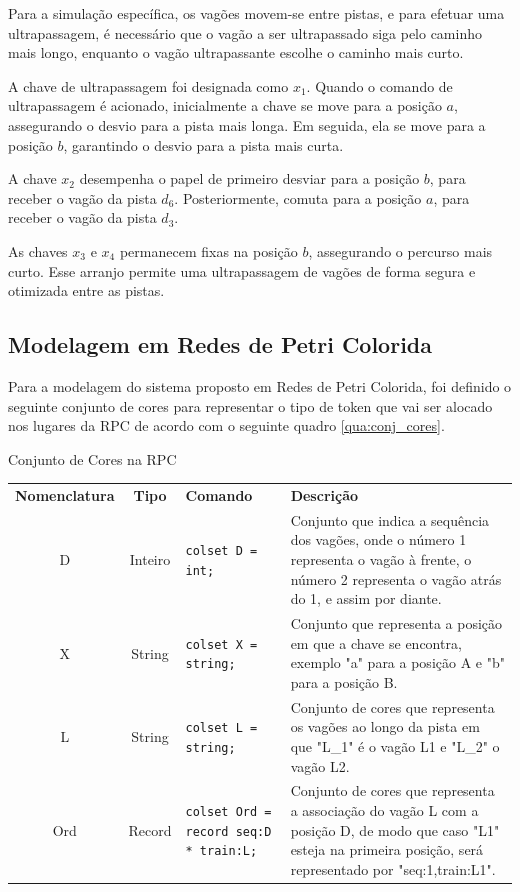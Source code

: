 Para a simulação específica, os vagões movem-se entre pistas, e para efetuar uma ultrapassagem, é necessário que o vagão a ser ultrapassado siga pelo caminho mais longo, enquanto o vagão ultrapassante escolhe o caminho mais curto.

A chave de ultrapassagem foi designada como $x_1$. Quando o comando de ultrapassagem é acionado, inicialmente a chave se move para a posição $a$, assegurando o desvio para a pista mais longa. Em seguida, ela se move para a posição $b$, garantindo o desvio para a pista mais curta.

A chave $x_2$ desempenha o papel de primeiro desviar para a posição $b$, para receber o vagão da pista $d_6$. Posteriormente, comuta para a posição $a$, para receber o vagão da pista $d_3$.

As chaves $x_3$ e $x_4$ permanecem fixas na posição $b$, assegurando o percurso mais curto. Esse arranjo permite uma ultrapassagem de vagões de forma segura e otimizada entre as pistas.

\subsection{Modelagem em Redes de Petri Colorida}
\label{sec:model_RPC}
Para a modelagem do sistema proposto em Redes de Petri Colorida, foi definido o seguinte conjunto de cores para representar o tipo de token que vai ser alocado nos lugares da RPC de acordo com o seguinte quadro \ref{qua:conj_cores}.

\begin{quadro}[h]
\centering
\caption{Conjunto de Cores na RPC}
\begin{tabularx}{\textwidth}{|c|c|X|X|}
\hline
\textbf{Nomenclatura} & \textbf{Tipo}    & \textbf{Comando}                             & \textbf{Descrição} \\
\cline{1-4}
D & Inteiro & \texttt{colset D = int;} 
& Conjunto que indica a sequência dos vagões, onde o número 1 representa o vagão à frente, o número 2 representa o vagão atrás do 1, e assim por diante. \\ 
\cline{1-4}
X & String  & \texttt{colset X = string;} 
& Conjunto que representa a posição em que a chave se encontra, exemplo "a" para a posição A e "b" para a posição B. \\
\cline{1-4}
L & String  & \texttt{colset L = string;}         
& Conjunto de cores que representa os vagões ao longo da pista em que "L\_1" é o vagão L1 e "L\_2" o vagão L2. \\
\cline{1-4}
Ord & Record  & \texttt{colset Ord = record seq:D * train:L;} 
& Conjunto de cores que representa a associação do vagão L com a posição D,
de modo que caso "L1" esteja na primeira posição, será representado por "seq:1,train:L1". \\ 
\cline{1-4}

\end{tabularx}
\label{qua:conj_cores}
\end{quadro}

